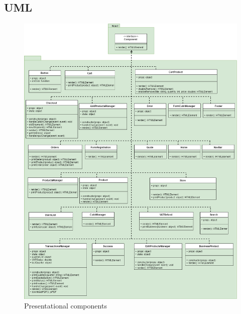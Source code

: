 \subsection{UML} 
\begin{figure}[H]
	\centering\includegraphics[scale = 0.38]{res/images/Presentational.png}
	\caption{Presentational components}
\end{figure}
